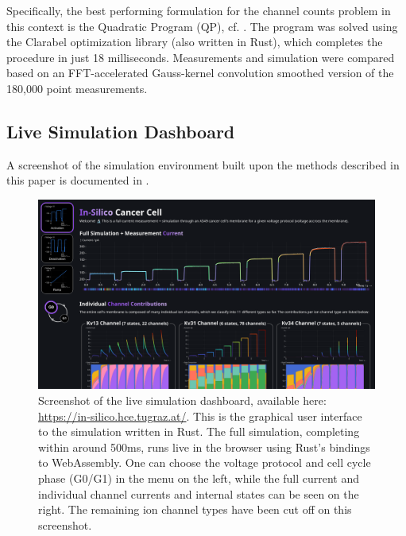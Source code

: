 Specifically, the best performing formulation for the channel counts problem in this context is the Quadratic Program (QP), cf. .
The program was solved using the Clarabel \parencite{2024-clarabel} optimization library (also written in Rust), which completes the procedure in just 18 milliseconds.
Measurements and simulation were compared based on an FFT-accelerated Gauss-kernel convolution smoothed version of the 180,000 point measurements.

\subsection{Live Simulation Dashboard}
A screenshot of the simulation environment built upon the methods described in this paper is documented in .

\begin{figure}[ht]
  \includegraphics[width=\textwidth]{../figures/above-the-fold-screenshot.png}
  \caption{Screenshot of the live simulation dashboard, available here: \url{https://in-silico.hce.tugraz.at/}. This is the graphical user interface to the simulation written in Rust. The full simulation, completing within around 500ms, runs live in the browser using Rust's bindings to WebAssembly. One can choose the voltage protocol and cell cycle phase (G0/G1) in the menu on the left, while the full current and individual channel currents and internal states can be seen on the right. The remaining ion channel types have been cut off on this screenshot.}
  \label{figure:screenshot}
\end{figure}
